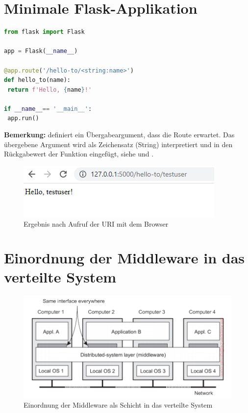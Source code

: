\documentclass[a4paper,titlepage,halfparskip,12pt,listof=numbered]{scrreprt}
\begin{document}


\chapter{Minimale Flask-Applikation}
\label{chap:FlaskBeginner}

\begin{lstlisting}[language=python,caption={Minimale Flask Applikation}, label={lst:MinimalFlaskApp}]
from flask import Flask

app = Flask(__name__)

@app.route('/hello-to/<string:name>')
def hello_to(name):
 return f'Hello, {name}!'

if __name__== '__main__':
 app.run()
\end{lstlisting}

\textbf{Bemerkung:} \grqq definiert ein Übergabeargument, dass die Route erwartet. Das übergebene Argument wird als Zeichensatz (String) interpretiert und in den Rückgabewert der Funktion eingefügt, siehe \cite{flaskDocRouting} und \cite{pythonDocFormattedStrings}.

\begin{figure}[h]
	\centering
	\includegraphics[width=.7\linewidth]{images/ResultMinimalApp}
	\caption{Ergebnis nach Aufruf der URI mit dem Browser}
	\label{img:ResultMinimalApp}
\end{figure}

\chapter{Einordnung der Middleware in das verteilte System}
\label{chap:MiddlewareArchitecture}

\begin{figure}[h]
	\centering
	\includegraphics[width=\linewidth]{images/MiddlewareArchitecture}
	\caption{Einordnung der Middleware als Schicht in das verteilte System \cite[S.20]{andrew2008verteilte}}
	\label{img:MiddlewareArchitecture}
\end{figure}
\end{document}
